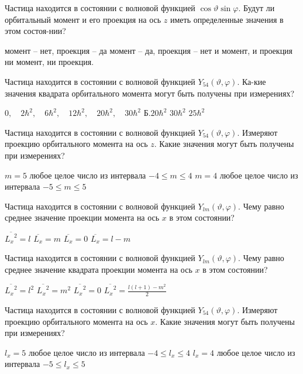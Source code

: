 \documentclass[11pt,a4paper]{exam}
\begin{document}
\begin{questions}
\question Частица находится в состоянии с волновой функцией $\cos \vartheta \sin \varphi $. Будут ли орбитальный момент и его проекция на ось $z$ иметь определенные значения в этом состоя-нии?
\begin{choices}
\choice момент – нет, проекция – да         
\choice момент – да, проекция – нет 
\choice и момент, и проекция          
\choice ни момент, ни проекция.
\end{choices}

\question Частица находится в состоянии с волновой функцией ${Y_{54}}(\vartheta ,\varphi )$. Ка-кие значения квадрата орбитального момента могут быть получены при измерениях?
\begin{choices}
\choice $0,\quad 2{\hbar ^2},\quad 6{\hbar ^2},\quad 12{\hbar ^2},\quad 20{\hbar ^2},\quad 30{\hbar ^2}$      Б.$20{\hbar ^2}$
\choice $30{\hbar ^2}$                
\choice $25{\hbar ^2}$
\end{choices}

\question Частица находится в состоянии с волновой функцией ${Y_{54}}(\vartheta ,\varphi )$. Измеряют проекцию орбитального момента на ось $z$. Какие значения могут быть получены при измерениях?
\begin{choices}
\choice $m = 5$        
\choice любое целое число из интервала $ - 4 \le m \le 4$
\choice $m = 4$        
\choice любое целое число из интервала $ - 5 \le m \le 5$
\end{choices}

\question Частица находится в состоянии с волновой функцией ${Y_{lm}}(\vartheta ,\varphi )$. Чему равно среднее значение проекции момента на ось $x$ в этом состоянии?
\begin{choices}
\choice $\overline {{L_x}^2}  = l$    
\choice $\overline {{L_x}}  = m$      
\choice $\overline {{L_x}}  = 0$      
\choice $\overline {{L_x}}  = l - m$
\end{choices}

\question Частица находится в состоянии с волновой функцией ${Y_{lm}}(\vartheta ,\varphi )$. Чему равно среднее значение квадрата проекции момента на ось $x$ в этом состоянии?
\begin{choices}
\choice $\overline {{L_x}^2}  = {l^2}$      
\choice $\overline {{L_x}^2}  = {m^2}$      
\choice $\overline {{L_x}^2}  = 0$    
\choice $\overline {{L_x}^2}  = \frac{{l(l + 1) - {m^2}}}{2}$
\end{choices}

\question Частица находится в состоянии с волновой функцией ${Y_{54}}(\vartheta ,\varphi )$. Измеряют проекцию орбитального момента на ось $x$. Какие значения могут быть получены при измерениях?
\begin{choices}
\choice ${l_x} = 5$       
\choice любое целое число из интервала $ - 4 \le {l_x} \le 4$
\choice ${l_x} = 4$       
\choice любое целое число из интервала $ - 5 \le {l_x} \le 5$
\end{choices}


\end{questions}
\end{document}
